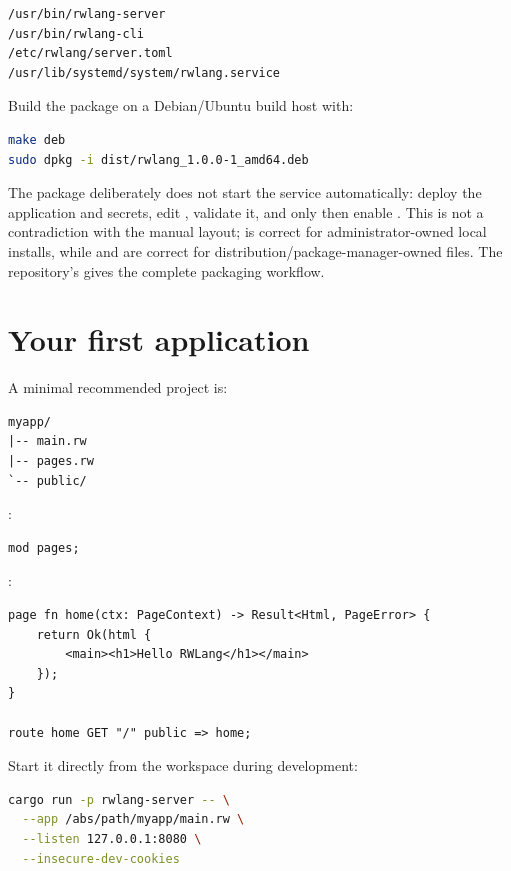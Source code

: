 \begin{lstlisting}
/usr/bin/rwlang-server
/usr/bin/rwlang-cli
/etc/rwlang/server.toml
/usr/lib/systemd/system/rwlang.service
\end{lstlisting}

Build the package on a Debian/Ubuntu build host with:

\begin{lstlisting}[language=bash]
make deb
sudo dpkg -i dist/rwlang_1.0.0-1_amd64.deb
\end{lstlisting}

The package deliberately does not start the service automatically: deploy the application and secrets, edit , validate it, and only then enable . This is not a contradiction with the manual layout;  is correct for administrator-owned local installs, while  and  are correct for distribution/package-manager-owned files. The repository's  gives the complete packaging workflow.

\section{Your first application}

A minimal recommended project is:

\begin{lstlisting}
myapp/
|-- main.rw
|-- pages.rw
`-- public/
\end{lstlisting}

:

\begin{lstlisting}[language=RWLang]
mod pages;
\end{lstlisting}

:

\begin{lstlisting}[language=RWLang]
page fn home(ctx: PageContext) -> Result<Html, PageError> {
    return Ok(html {
        <main><h1>Hello RWLang</h1></main>
    });
}

route home GET "/" public => home;
\end{lstlisting}

Start it directly from the workspace during development:

\begin{lstlisting}[language=bash]
cargo run -p rwlang-server -- \
  --app /abs/path/myapp/main.rw \
  --listen 127.0.0.1:8080 \
  --insecure-dev-cookies
\end{lstlisting}

